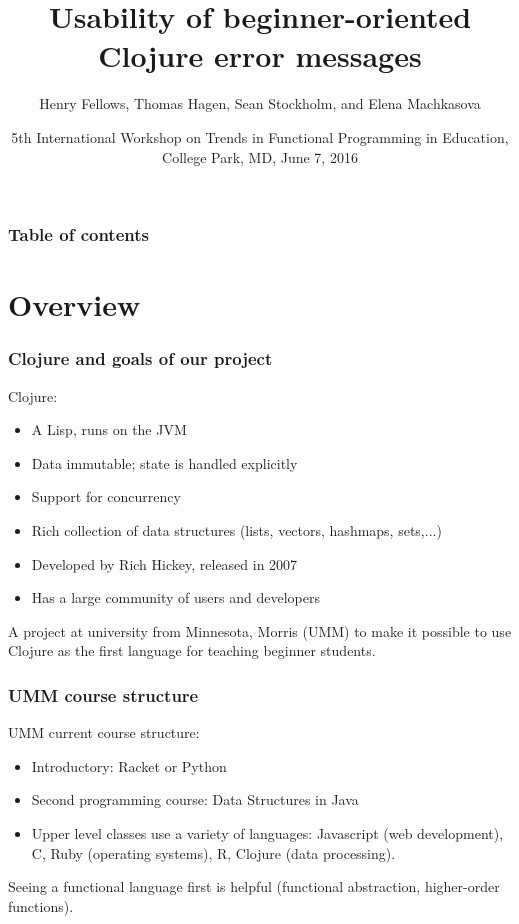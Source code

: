 \documentclass{beamer}
\begin{document}
\title{Usability of beginner-oriented Clojure error messages}
\author{Henry Fellows, Thomas Hagen, Sean Stockholm, 
and Elena Machkasova}
\date{5th International Workshop on Trends in Functional Programming in Education, \\
College Park, MD, June 7, 2016}

\begin{frame}
\titlepage
\end{frame}

\begin{frame}
\frametitle{Table of contents}
\tableofcontents  
\end{frame}

\section{Overview}

\begin{frame}
\frametitle{Clojure and goals of our project }
Clojure:
\begin{itemize}
\item A Lisp, runs on the JVM
\item Data immutable; state is handled explicitly 
\item Support for concurrency 
\item Rich collection of data structures (lists, vectors, hashmaps, sets,...)
\item Developed by Rich Hickey, released in 2007
\item Has a large community of users and developers 
\end{itemize}

A project at university from Minnesota, Morris (UMM) to make it possible to use Clojure as the first language for teaching beginner students. 
\end{frame}

\begin{frame}
\frametitle{UMM course structure}
UMM current course structure:
\begin{itemize}
\item Introductory: Racket or Python 
\item Second programming course: Data Structures in Java
\item Upper level classes use a variety of languages:  Javascript (web development), C, Ruby (operating systems),  R, Clojure (data processing). 
\end{itemize} 
Seeing a functional language first is helpful (functional abstraction, higher-order functions). 

\end{frame}
\end{document}
